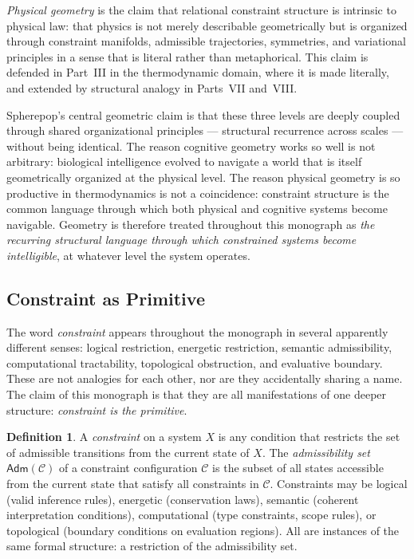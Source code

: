 \documentclass[12pt,openany]{book}
\theoremstyle{plain}
\theoremstyle{definition}
\newtheorem{definition}[theorem]{Definition}
\theoremstyle{remark}
\newcommand{\sadm}{\mathsf{Adm}}
\begin{document}
\emph{Physical geometry} is the claim that relational constraint structure is intrinsic to physical law: that physics is not merely describable geometrically but is organized through constraint manifolds, admissible trajectories, symmetries, and variational principles in a sense that is literal rather than metaphorical. This claim is defended in Part~III in the thermodynamic domain, where it is made literally, and extended by structural analogy in Parts~VII and~VIII.

Spherepop's central geometric claim is that these three levels are deeply coupled through shared organizational principles — structural recurrence across scales — without being identical. The reason cognitive geometry works so well is not arbitrary: biological intelligence evolved to navigate a world that is itself geometrically organized at the physical level. The reason physical geometry is so productive in thermodynamics is not a coincidence: constraint structure is the common language through which both physical and cognitive systems become navigable. Geometry is therefore treated throughout this monograph as \emph{the recurring structural language through which constrained systems become intelligible}, at whatever level the system operates.

\subsection*{Constraint as Primitive}

The word \emph{constraint} appears throughout the monograph in several apparently different senses: logical restriction, energetic restriction, semantic admissibility, computational tractability, topological obstruction, and evaluative boundary. These are not analogies for each other, nor are they accidentally sharing a name. The claim of this monograph is that they are all manifestations of one deeper structure: \emph{constraint is the primitive}.

\begin{definition}
A \emph{constraint} on a system $X$ is any condition that restricts the set of admissible transitions from the current state of $X$. The \emph{admissibility set} $\sadm(\mathcal{C})$ of a constraint configuration $\mathcal{C}$ is the subset of all states accessible from the current state that satisfy all constraints in $\mathcal{C}$. Constraints may be logical (valid inference rules), energetic (conservation laws), semantic (coherent interpretation conditions), computational (type constraints, scope rules), or topological (boundary conditions on evaluation regions). All are instances of the same formal structure: a restriction of the admissibility set.
\end{definition}
\end{document}
